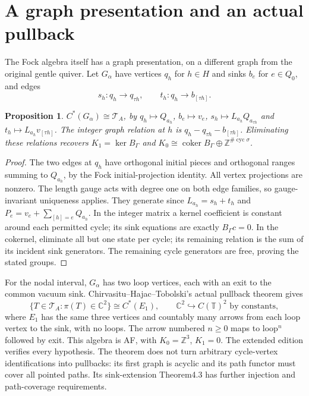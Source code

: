 \documentclass[11pt,oneside,openany]{book}
\newtheorem{proposition}[theorem]{Proposition}
\theoremstyle{definition}\newtheorem{definition}[theorem]{Definition}
\theoremstyle{remark}\newtheorem{remark}[theorem]{Remark}
\newcommand{\C}{\mathbb C}\newcommand{\Z}{\mathbb Z}\newcommand{\R}{\mathbb R}
\begin{document}
\section{A graph presentation and an actual pullback}
The Fock algebra itself has a graph presentation, on a different graph from the original gentle quiver. Let $G_\alpha$ have vertices $q_h$ for $h\in H$ and sinks $b_e$ for $e\in Q_0$, and edges
\[
 s_h:q_h\to q_{\tau h},\qquad t_h:q_h\to b_{[\tau h]}.
\]
\begin{proposition}\label{thm:graphmodel}
$C^*(G_\alpha)\cong\mathcal T_A$, by $q_h\mapsto Q_{a_h}$, $b_e\mapsto v_e$, $s_h\mapsto L_{a_h}Q_{a_{\tau h}}$ and $t_h\mapsto L_{a_h}v_{[\tau h]}$. The integer graph relation at $h$ is $q_h-q_{\tau h}-b_{[\tau h]}$. Eliminating these relations recovers $K_1=\ker B_\Gamma$ and $K_0\cong\operatorname{coker}B_\Gamma\oplus\Z^{\#\operatorname{cyc}\sigma}$.
\end{proposition}
\begin{proof}
The two edges at $q_h$ have orthogonal initial pieces and orthogonal ranges summing to $Q_{a_h}$, by the Fock initial-projection identity. All vertex projections are nonzero. The length gauge acts with degree one on both edge families, so gauge-invariant uniqueness applies. They generate since $L_{a_h}=s_h+t_h$ and $P_e=v_e+\sum_{[h]=e}Q_{a_h}$. In the integer matrix a kernel coefficient is constant around each permitted cycle; its sink equations are exactly $B_\Gamma c=0$. In the cokernel, eliminate all but one state per cycle; its remaining relation is the sum of its incident sink generators. The remaining cycle generators are free, proving the stated groups.
\end{proof}
For the nodal interval, $G_\alpha$ has two loop vertices, each with an exit to the common vacuum sink. Chirvasitu--Hajac--Tobolski's actual pullback theorem \cite[Theorem3.4]{GraphPullbacks} gives
\[
 \{T\in\mathcal T_A:\pi(T)\in\C^2\}
 \cong C^*(E_1),\qquad \C^2\hookrightarrow C(\mathbb T)^2\text{ by constants},
\]
where $E_1$ has the same three vertices and countably many arrows from each loop vertex to the sink, with no loops. The arrow numbered $n\ge0$ maps to loop$^n$ followed by exit. This algebra is AF, with $K_0=\Z^3$, $K_1=0$. The extended edition verifies every hypothesis. The theorem does not turn arbitrary cycle-vertex identifications into pullbacks: its first graph is acyclic and its path functor must cover all pointed paths. Its sink-extension Theorem4.3 has further injection and path-coverage requirements.
\end{document}
